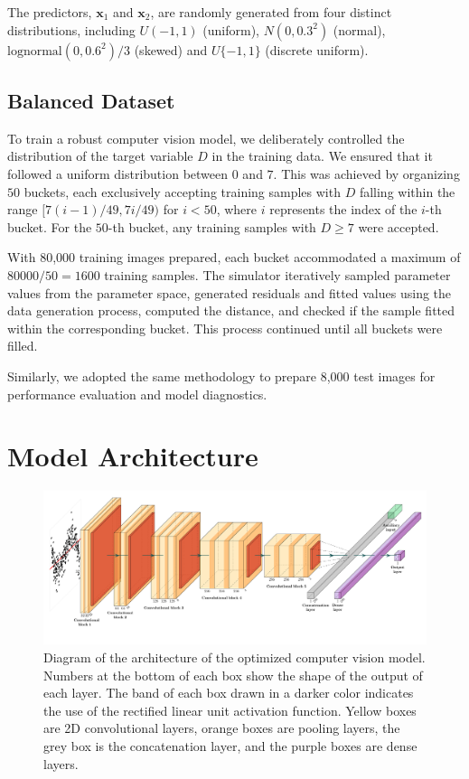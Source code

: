 \documentclass[]{interact}
\theoremstyle{plain}%
\theoremstyle{definition}
\theoremstyle{remark}
\begin{document}
The predictors, \(\boldsymbol{x}_1\) and \(\boldsymbol{x}_2\), are
randomly generated from four distinct distributions, including
\(U(-1, 1)\) (uniform), \(N(0, 0.3^2)\) (normal),
\(\text{lognormal}(0, 0.6^2)/3\) (skewed) and \(U\{-1, 1\}\) (discrete
uniform).

\subsection{Balanced Dataset}\label{balanced-dataset}

To train a robust computer vision model, we deliberately controlled the
distribution of the target variable \(D\) in the training data. We
ensured that it followed a uniform distribution between \(0\) and \(7\).
This was achieved by organizing \(50\) buckets, each exclusively
accepting training samples with \(D\) falling within the range
\([7(i - 1)/49, 7i/49)\) for \(i < 50\), where \(i\) represents the
index of the \(i\)-th bucket. For the \(50\)-th bucket, any training
samples with \(D \geq 7\) were accepted.

With 80,000 training images prepared, each bucket accommodated a maximum
of \(80000/ 50 = 1600\) training samples. The simulator iteratively
sampled parameter values from the parameter space, generated residuals
and fitted values using the data generation process, computed the
distance, and checked if the sample fitted within the corresponding
bucket. This process continued until all buckets were filled.

Similarly, we adopted the same methodology to prepare 8,000 test images
for performance evaluation and model diagnostics.

\section{Model Architecture}\label{sec-model-architecture}

\begin{figure}

{\centering \includegraphics[width=1\linewidth]{paper_files/figure-latex/cnn-diag-1} 

}

\caption{Diagram of the architecture of the optimized computer vision model. Numbers at the bottom of each box show the shape of the output of each layer. The band of each box drawn in a darker color indicates the use of the rectified linear unit activation function.  Yellow boxes are 2D convolutional layers, orange boxes are pooling layers, the grey box is the concatenation layer, and the purple boxes are dense layers.}\label{fig:cnn-diag}
\end{figure}
\end{document}
